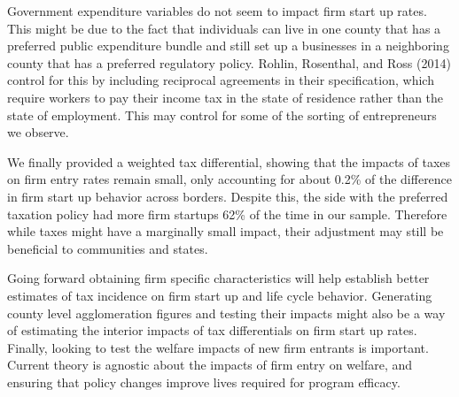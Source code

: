 Government expenditure variables do not seem to impact firm start up rates. This might be due to the fact that individuals can live in one county that has a preferred public expenditure bundle and still set up a businesses in a neighboring county that has a preferred regulatory policy. Rohlin, Rosenthal, and Ross (2014) control for this by including reciprocal agreements in their specification, which require workers to pay their income tax in the state of residence rather than the state of employment. This may control for some of the sorting of entrepreneurs we observe.

We finally provided a weighted tax differential, showing that the impacts of taxes on firm entry rates remain small, only accounting for about 0.2\% of the difference in firm start up behavior across borders. Despite this, the side with the preferred taxation policy had more firm startups 62\% of the time in our sample. Therefore while taxes might have a marginally small impact, their adjustment may still be beneficial to communities and states. 

Going forward obtaining firm specific characteristics will help establish better estimates of tax incidence on firm start up and life cycle behavior. Generating county level agglomeration figures and testing their impacts might also be a way of estimating the interior impacts of tax differentials on firm start up rates. Finally, looking to test the welfare impacts of new firm entrants is important. Current theory is agnostic about the impacts of firm entry on welfare, and ensuring that policy changes improve lives required for program efficacy.